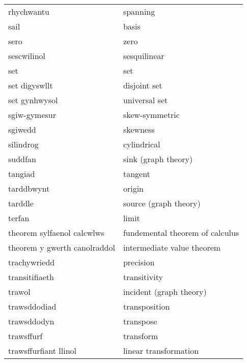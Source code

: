 \begin{supertabular}{p{0.22\textwidth}p{0.22\textwidth}}
                      rhychwantu &                          spanning \\
                            sail &                             basis \\
                            sero &                              zero \\
                     sescwilinol &                      sesquilinear \\
                             set &                               set \\
                   set digyswllt &                      disjoint set \\
                   set gynhwysol &                     universal set \\
                    sgiw-gymesur &                    skew-symmetric \\
                         sgiwedd &                          skewness \\
                       silindrog &                       cylindrical \\
                         suddfan &               sink (graph theory) \\
                         tangiad &                           tangent \\
                      tarddbwynt &                            origin \\
                         tarddle &             source (graph theory) \\
                          terfan &                             limit \\
      theorem sylfaenol calcwlws &   fundemental theorem of calculus \\
    theorem y gwerth canolraddol &        intermediate value theorem \\
                    trachywriedd &                         precision \\
                  transitifiaeth &                      transitivity \\
                          trawol &           incident (graph theory) \\
                    trawsddodiad &                     transposition \\
                     trawsddodyn &                         transpose \\
                      trawsffurf &                         transform \\
           trawsffurfiant llinol &             linear transformation \\

\end{supertabular}
